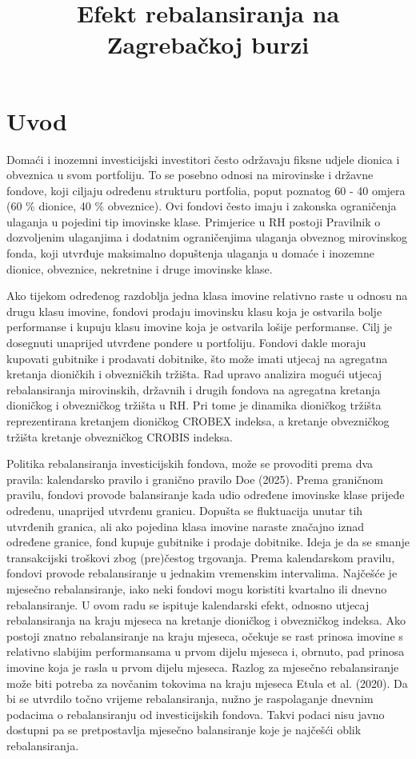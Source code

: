 \documentclass[
  letterpaper,
  DIV=11,
  numbers=noendperiod]{scrartcl}
\title{Efekt rebalansiranja na Zagrebačkoj burzi}
\author{}
\date{}
\begin{document}
\maketitle


\section{Uvod}\label{uvod}

Domaći i inozemni investicijski investitori često održavaju fiksne
udjele dionica i obveznica u svom portfoliju. To se posebno odnosi na
mirovinske i državne fondove, koji ciljaju određenu strukturu portfolia,
poput poznatog 60 - 40 omjera (60 \% dionice, 40 \% obveznice). Ovi
fondovi često imaju i zakonska ograničenja ulaganja u pojedini tip
imovinske klase. Primjerice u RH postoji Pravilnik o dozvoljenim
ulaganjima i dodatnim ograničenjima ulaganja obveznog mirovinskog fonda,
koji utvrđuje maksimalno dopuštenja ulaganja u domaće i inozemne
dionice, obveznice, nekretnine i druge imovinske klase.

Ako tijekom određenog razdoblja jedna klasa imovine relativno raste u
odnosu na drugu klasu imovine, fondovi prodaju imovinsku klasu koja je
ostvarila bolje performanse i kupuju klasu imovine koja je ostvarila
lošije performanse. Cilj je dosegnuti unaprijed utvrđene pondere u
portfoliju. Fondovi dakle moraju kupovati gubitnike i prodavati
dobitnike, što može imati utjecaj na agregatna kretanja dioničkih i
obvezničkih tržišta. Rad upravo analizira mogući utjecaj rebalansiranja
mirovinskih, državnih i drugih fondova na agregatna kretanja dioničkog i
obvezničkog tržišta u RH. Pri tome je dinamika dioničkog tržišta
reprezentirana kretanjem dioničkog CROBEX indeksa, a kretanje
obvezničkog tržišta kretanje obvezničkog CROBIS indeksa.

Politika rebalansiranja investicijskih fondova, može se provoditi prema
dva pravila: kalendarsko pravilo i granično pravilo Doe (2025). Prema
graničnom pravilu, fondovi provode balansiranje kada udio određene
imovinske klase prijeđe određenu, unaprijed utvrđenu granicu. Dopušta se
fluktuacija unutar tih utvrđenih granica, ali ako pojedina klasa imovine
naraste značajno iznad određene granice, fond kupuje gubitnike i prodaje
dobitnike. Ideja je da se smanje transakcijski troškovi zbog (pre)čestog
trgovanja. Prema kalendarskom pravilu, fondovi provode rebalansiranje u
jednakim vremenskim intervalima. Najčešće je mjesečno rebalansiranje,
iako neki fondovi mogu koristiti kvartalno ili dnevno rebalansiranje. U
ovom radu se ispituje kalendarski efekt, odnosno utjecaj rebalansiranja
na kraju mjeseca na kretanje dioničkog i obvezničkog indeksa. Ako
postoji znatno rebalansiranje na kraju mjeseca, očekuje se rast prinosa
imovine s relativno slabijim performansama u prvom dijelu mjeseca i,
obrnuto, pad prinosa imovine koja je rasla u prvom dijelu mjeseca.
Razlog za mjesečno rebalansiranje može biti potreba za novčanim tokovima
na kraju mjeseca Etula et al. (2020). Da bi se utvrdilo točno vrijeme
rebalansiranja, nužno je raspolaganje dnevnim podacima o rebalansiranju
od investicijskih fondova. Takvi podaci nisu javno dostupni pa se
pretpostavlja mjesečno balansiranje koje je najčešći oblik
rebalansiranja.
\end{document}
